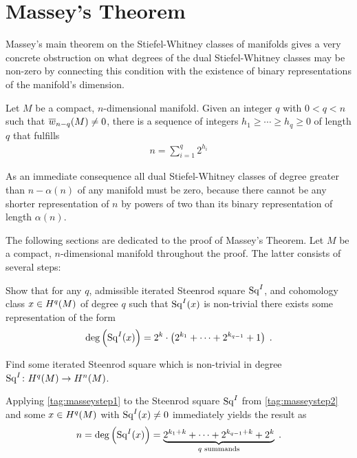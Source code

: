 % 

\chapter{Massey's Theorem}

Massey's main theorem on the Stiefel-Whitney classes of manifolds
gives a very concrete obstruction on what degrees of the dual
Stiefel-Whitney classes may be non-zero
by connecting this condition with the existence of binary
representations of the manifold's dimension.
\begin{Thm}[Massey]\label{thm:massey}
  Let $M$ be a compact, $n$-dimensional manifold.
  Given an integer $q$ with $0<q<n$ such that ${\overline{w}_{n-q}}(M)\neq0$,
  there is a sequence of integers $h_1\geq\dotsb\geq h_q\geq0$ of
  length $q$ that fulfills
  \begin{gather*}
    n = \sum_{i=1}^{q} 2^{h_i}
  \end{gather*}
\end{Thm}

As an immediate consequence all dual Stiefel-Whitney classes of degree
greater than $n-\alpha(n)$ of any manifold must be zero, because there
cannot be any shorter representation of $n$ by powers of two
than its binary representation of length $\alpha(n)$.

The following sections are dedicated to the proof of Massey's Theorem.
Let $M$ be a compact, $n$-dimensional manifold throughout the proof.
The latter consists of several steps:
\begin{steps}
\item\label{tag:masseystep1}
  Show that for any $q$, admissible iterated Steenrod square $\mathrm{Sq}^{I}$, and cohomology
  class $x\in H^q(M)$ of degree $q$ such that $\mathrm{Sq}^{I}(x)$ is non-trivial there exists
  some representation of the form
  \begin{gather*}
    \deg \left(\mathrm{Sq}^{I}(x)\right)
    = 2^k\cdot
    \left( 2^{k_1}+\dotsb+2^{k_{q-1}} + 1 \right)
    \;.
  \end{gather*}
\item\label{tag:masseystep2}
  Find some iterated Steenrod square which is non-trivial in degree
  $\mathrm{Sq}^{I}\colon H^q(M)\to H^n(M)$.
\end{steps}
Applying \ref{tag:masseystep1} to the Steenrod square $\mathrm{Sq}^{I}$ from
\ref{tag:masseystep2} and some $x\in H^q(M)$ with $\mathrm{Sq}^{I}(x)\neq 0$
immediately yields the result as
\begin{gather*}
  n = \deg\left(\mathrm{Sq}^{I}(x)\right) = \underbrace
  {2^{k_1+k}+\dotsb+2^{k_{q-1}+k} + 2^{k}}_{\text{$q$ summands}}
  \;.
\end{gather*}

